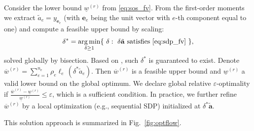 \documentclass[preprint,3p]{elsarticle}
\DeclareMathOperator*{\argmin}{arg\,min}
\newcommand{\nel}{n_\mathrm{e}}
\numberwithin{equation}{section}
\begin{document}
Consider the lower bound $\underline{w}^{(r)}$ from \eqref{eq:sos_fv}. From the first-order moments we extract $\tilde{a}_e=y_{\mathbf{e}_e}$ (with $\mathbf{e}_e$ being the unit vector with $e$-th component equal to one) and compute a feasible upper bound by scaling:
%
\begin{equation}\label{eq:scaling}
  \delta^*=\argmin_{\delta\ge 1}\{\ \delta:\ \delta\tilde{\mathbf{a}}\ \text{satisfies}\ \eqref{eq:sdp_fv}\ \},
\end{equation}
%
solved globally by bisection. Based on \citep[Proposition 3.12]{Tyburec2024global}, such $\delta^*$ is guaranteed to exist. Denote $\overline{w}^{(r)}=\sum_{e=1}^{\nel}\rho_e\ell_e\,(\delta^*\tilde{a}_e)$. Then $\overline{w}^{(r)}$ is a feasible upper bound and $\underline{w}^{(r)}$ a valid lower bound on the global optimum. We declare global relative $\varepsilon$-optimality if $\frac{\overline{w}^{(r)}-\underline{w}^{(r)}}{\underline{w}^{(r)}}\le \varepsilon$, which is a sufficient condition. In practice, we further refine $\overline{w}^{(r)}$ by a local optimization (e.g., sequential SDP) initialized at $\delta^*\tilde{\mathbf{a}}$.

This solution approach is summarized in Fig.~\ref{fig:optflow}.
\end{document}
